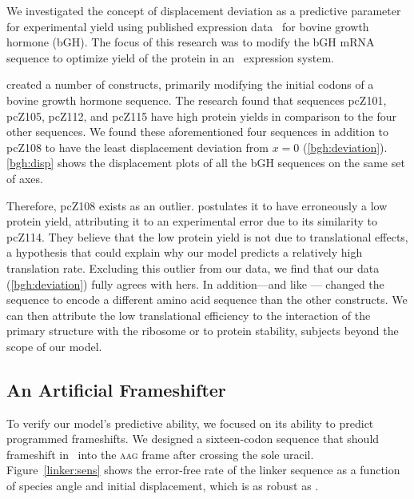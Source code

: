 \documentclass[11pt]{article}
\begin{document}
We investigated the concept of displacement deviation as a predictive parameter
for experimental yield using published expression data~\cite{schoner:bgh} for bovine growth hormone (bGH).
The focus of this research was to modify the bGH mRNA sequence to optimize
yield of the protein in an \ecoli\ expression system.

\citet{schoner:bgh} created a number of constructs, primarily
modifying the initial codons of a bovine growth hormone sequence. The
research found that sequences pcZ101, pcZ105, pcZ112, and pcZ115 have
high protein yields in comparison to the four other sequences. We
found these aforementioned four sequences in addition to pcZ108 to
have the least displacement deviation from $x = 0$
(\autoref{bgh:deviation}). \autoref{bgh:disp} shows the displacement
plots of all the bGH sequences on the same set of axes.

Therefore, pcZ108 exists as an outlier. \citeauthor{schoner:bgh}
postulates it to have erroneously a low protein yield, attributing it
to an experimental error due to its similarity to pcZ114. They believe
that the low protein yield is not due to translational effects, a
hypothesis that could explain why our model predicts a relatively high
translation rate. Excluding this outlier from our data, we find that
our data (\autoref{bgh:deviation}) fully agrees with hers. In
addition---and like \citeauthor{weiss87}---\citeauthor{schoner:bgh}
changed the sequence to encode a different amino acid sequence than
the other constructs. We can then attribute the low translational
efficiency to the interaction of the primary structure with the
ribosome or to protein stability, subjects beyond the scope of our
model.

\subsection{An Artificial Frameshifter}
\label{section:linker}
To verify our model's predictive ability, we focused on its ability to
predict programmed frameshifts. We designed a sixteen-codon sequence
that should frameshift in \ecoli\ into
the \textsc{aag} frame after crossing the sole uracil.  Figure~\ref{linker:sens}
shows the error-free rate of the linker sequence as a function of species
angle and initial displacement, which is as robust as \prfB.
\end{document}
